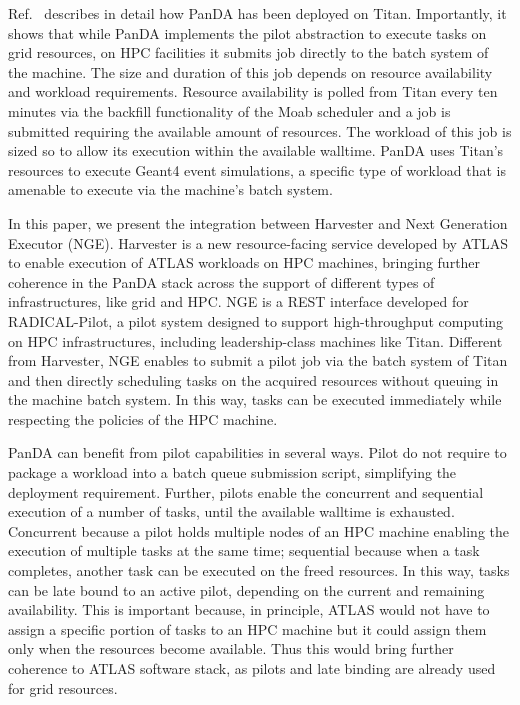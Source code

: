\documentclass{webofc}
\begin{document}
Ref.~\cite{panda-paper} describes in detail how PanDA has been deployed on Titan. Importantly, it shows that while PanDA implements the pilot abstraction to execute tasks on grid resources, on HPC facilities it submits job directly to the batch system of the machine. The size and duration of this job depends on resource availability and workload requirements. Resource availability is polled from Titan every ten minutes via the backfill functionality of the Moab scheduler and a job is submitted requiring the available amount of resources. The workload of this job is sized so to allow its execution within the available walltime. PanDA uses Titan’s resources to execute Geant4 event simulations, a specific type of workload that is amenable to execute via the machine’s batch system. 

In this paper, we present the integration between Harvester and Next Generation Executor (NGE). Harvester is a new resource-facing service developed by ATLAS to enable execution of ATLAS workloads on HPC machines, bringing further coherence in the PanDA stack across the support of different types of infrastructures, like grid and HPC. NGE is a REST interface developed for RADICAL-Pilot, a pilot system designed to support high-throughput computing on HPC infrastructures, including leadership-class machines like Titan. Different from Harvester, NGE enables to submit a pilot job via the batch system of Titan and then directly scheduling tasks on the acquired resources without queuing in the machine batch system. In this way, tasks can be executed immediately while respecting the policies of the HPC machine.

PanDA can benefit from pilot capabilities in several ways. Pilot do not require to package a workload into a batch queue submission script, simplifying the deployment requirement. Further, pilots enable the concurrent and sequential execution of a number of tasks, until the available walltime is exhausted. Concurrent because a pilot holds multiple nodes of an HPC machine enabling the execution of multiple tasks at the same time; sequential because when a task completes, another task can be executed on the freed resources. In this way, tasks can be late bound to an active pilot, depending on the current and remaining availability. This is important because, in principle, ATLAS would not have to assign a specific portion of tasks to an HPC machine but it could assign them only when the resources become available. Thus this would bring further coherence to ATLAS software stack, as pilots and late binding are already used for grid resources.
\end{document}
